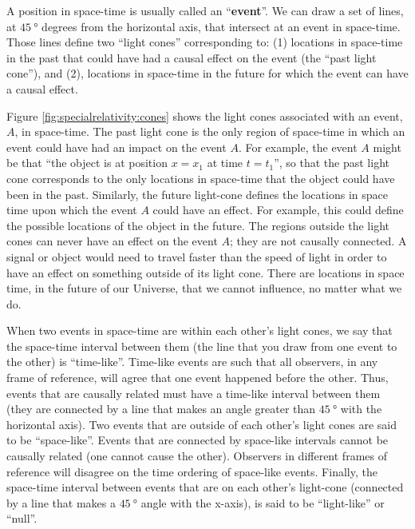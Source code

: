 A position in space-time is usually called an ``\textbf{event}''. We can draw a set of lines, at $\SI{45}{\degree}$ degrees from the horizontal axis, that intersect at an event in space-time. Those lines define two ``light cones'' corresponding to: (1) locations in space-time in the past that could have had a causal effect on the event (the ``past light cone''), and (2), locations in space-time in the future for which the event can have a causal effect.

Figure \ref{fig:specialrelativity:cones} shows the light cones associated with an event, $A$, in space-time. The past light cone is the only region of space-time in which an event could have had an impact on the event $A$. For example, the event $A$ might be that ``the object is at position $x=x_1$ at time $t=t_1$'', so that the past light cone corresponds to the only locations in space-time that the object could have been in the past. Similarly, the future light-cone defines the locations in space time upon which the event $A$ could have an effect. For example, this could define the possible locations of the object in the future. The regions outside the light cones can never have an effect on the event $A$; they are not causally connected. A signal or object would need to travel faster than the speed of light in order to have an effect on something outside of its light cone. There are locations in space time, in the future of our Universe, that we cannot influence, no matter what we do.

When two events in space-time are within each other's light cones, we say that the space-time interval between them (the line that you draw from one event to the other) is ``time-like''. Time-like events are such that all observers, in any frame of reference, will agree that one event happened before the other. Thus, events that are causally related must have a time-like interval between them (they are connected by a line that makes an angle greater than $\SI{45}{\degree}$ with the horizontal axis). Two events that are outside of each other's light cones are said to be ``space-like''. Events that are connected by space-like intervals cannot be causally related (one cannot cause the other). Observers in different frames of reference will disagree on the time ordering of space-like events. Finally, the space-time interval between events that are on each other's light-cone (connected by a line that makes a $\SI{45}{\degree}$ angle with the x-axis), is said to be ``light-like'' or ``null''. 

